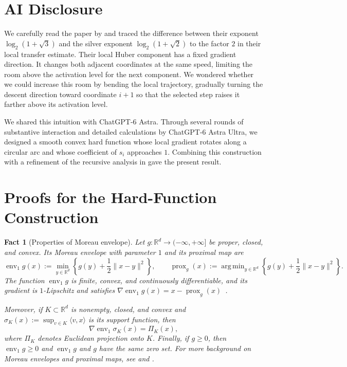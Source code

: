 \documentclass[11pt,letterpaper]{article}
\newtheorem{fact}[fact]{Fact}
\theoremstyle{definition}
\newcommand{\R}{\mathbb R}
\DeclareMathOperator*{\argminop}{arg\,min}
\begin{document}
\section*{AI Disclosure}

We carefully read the paper by \citet{JungChoYun2026} and traced the difference between their exponent $\log_2(1+\sqrt3)$ and the silver exponent $\log_2(1+\sqrt2)$ to the factor $2$ in their local transfer estimate.
Their local Huber component has a fixed gradient direction.
It changes both adjacent coordinates at the same speed, limiting the room above the activation level for the next component.
We wondered whether we could increase this room by bending the local trajectory, gradually turning the descent direction toward coordinate $i+1$ so that the selected step raises it farther above its activation level.

We shared this intuition with ChatGPT-6 Astra.
Through several rounds of substantive interaction and detailed calculations by ChatGPT-6 Astra Ultra, we designed a smooth convex hard function whose local gradient rotates along a circular arc and whose coefficient of $s_i$ approaches $1$.
Combining this construction with a refinement of the recursive analysis in \citet[Section~3]{JungChoYun2026} gave the present result.




\clearpage
\appendix
{}
\section{Proofs for the Hard-Function Construction}
\label{app:local}


\begin{fact}[Properties of Moreau envelope]
\label{lem:moreau-envelope}
Let $g:\R^d\to(-\infty,+\infty]$ be proper, closed, and convex.  Its Moreau
envelope with parameter $1$ and its proximal map are
\[
  \operatorname{env}_1 g(x)
  :=\min_{y\in\R^d}\left\{g(y)+\frac12\|x-y\|^2\right\},
  \qquad
  \operatorname{prox}_g(x)
  :=\argminop_{y\in\R^d}\left\{g(y)+\frac12\|x-y\|^2\right\}.
\]
The function $\operatorname{env}_1 g$ is finite, convex, and continuously differentiable, and its gradient is $1$-Lipschitz and satisfies $\nabla\operatorname{env}_1 g(x)=x-\operatorname{prox}_g(x)$~\citep[Propositions~5.b, 7.b, and~7.d]{Moreau1965}.

Moreover, if $K\subset\R^d$ is nonempty, closed, and convex and
$\sigma_K(x):=\sup_{v\in K}\langle v,x\rangle$ is its support function, then
\begin{equation*}
  \nabla\operatorname{env}_1\sigma_K(x)=\Pi_K(x),
\end{equation*}
where $\Pi_K$ denotes Euclidean projection onto $K$.
Finally, if $g\ge0$, then $\operatorname{env}_1g\ge0$ and
$\operatorname{env}_1g$ and $g$ have the same zero set. 
For more background on Moreau envelopes and proximal maps, see \citet[Sections~1.G and~2.D]{RockafellarWets1998} and \citet[Sections~3.1 and~6.4.2]{ParikhBoyd2014}.
\end{fact}
\end{document}
